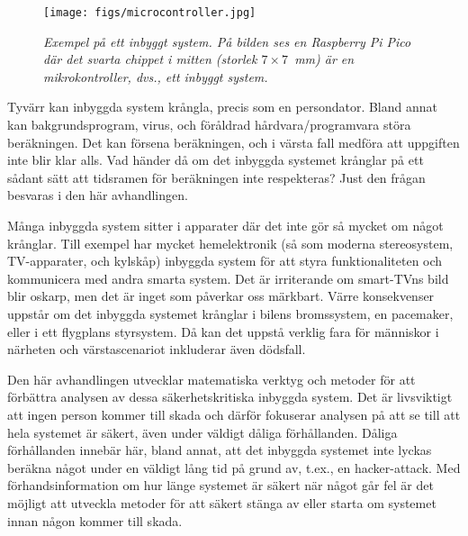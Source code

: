 \documentclass[svenska]{style/LTHthesis}
\begin{document}
\begin{figure}
    \vspace*{-2mm}
    \begin{centering}
        \texttt{[image: figs/microcontroller.jpg]}
    \end{centering}\small\par\medskip
        \noindent\emph{Exempel på ett inbyggt system. På bilden ses en Raspberry Pi Pico där det svarta chippet i mitten (storlek $7\times 7$~mm) är en mikrokontroller, dvs., ett inbyggt system.}\footnotemark
    \vspace*{-2mm}
\end{figure}

Tyvärr kan inbyggda system krångla, precis som en persondator.
Bland annat kan bakgrundsprogram, virus, och föråldrad hårdvara/programvara störa beräkningen.
Det kan försena beräkningen, och i värsta fall medföra att uppgiften inte blir klar alls.
Vad händer då om det inbyggda systemet krånglar på ett sådant sätt att tidsramen för beräkningen inte respekteras?
Just den frågan besvaras i den här avhandlingen.

Många inbyggda system sitter i apparater där det inte gör så mycket om något krånglar.
Till exempel har mycket hemelektronik (så som moderna stereosystem, TV-apparater, och kylskåp) inbyggda system för att styra funktionaliteten och kommunicera med andra smarta system.
Det är irriterande om smart-TVns bild blir oskarp, men det är inget som påverkar oss märkbart.
Värre konsekvenser uppstår om det inbyggda systemet krånglar i bilens bromssystem, en pacemaker, eller i ett flygplans styrsystem.
Då kan det uppstå verklig fara för människor i närheten och värstascenariot inkluderar även dödsfall.

Den här avhandlingen utvecklar matematiska verktyg och metoder för att förbättra analysen av dessa säkerhetskritiska inbyggda system.
Det är livsviktigt att ingen person kommer till skada och därför fokuserar analysen på att se till att hela systemet är säkert, även under väldigt dåliga förhållanden.
Dåliga förhållanden innebär här, bland annat, att det inbyggda systemet inte lyckas beräkna något under en väldigt lång tid på grund av, t.ex., en hacker-attack.
Med förhandsinformation om hur länge systemet är säkert när något går fel är det möjligt att utveckla metoder för att säkert stänga av eller starta om systemet innan någon kommer till skada.
\end{document}
